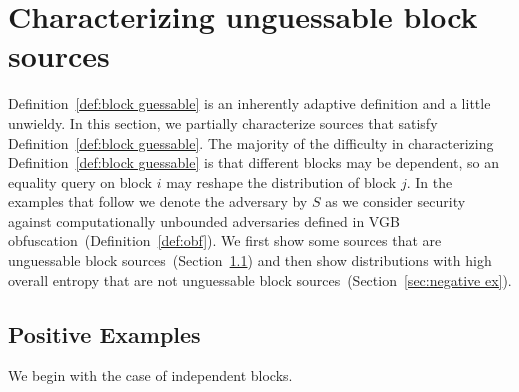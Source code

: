 \documentclass[11pt]{article}
\newcommand{\secref}[1]{\mbox{Section~\ref{#1}}}
\newcommand{\defref}[1]{\mbox{Definition~\ref{#1}}}
\newcommand{\consref}[1]{\mbox{Construction~\ref{#1}}}
\newcommand{\poly}{\ensuremath{\mathtt{poly}}\xspace}
\begin{document}
\section{Characterizing unguessable block sources}
\label{sec:characterize}

\defref{def:block guessable} is an inherently adaptive definition and a little unwieldy.  In this section, we partially characterize sources that satisfy \defref{def:block guessable}.
The majority of the difficulty in characterizing \defref{def:block guessable} is that different blocks may be dependent, so an equality query on block $i$ may reshape the distribution of block $j$.  In the examples that follow we denote the adversary by $S$ as we consider security against computationally unbounded adversaries defined in VGB obfuscation~(\defref{def:obf}).  We first show some sources that are unguessable block sources~(\secref{sec:positive ex}) and then show distributions with high overall entropy that are not unguessable block sources~(\secref{sec:negative ex}).

\subsection{Positive Examples}
\label{sec:positive ex}
We begin with the case of independent blocks.
\end{document}
